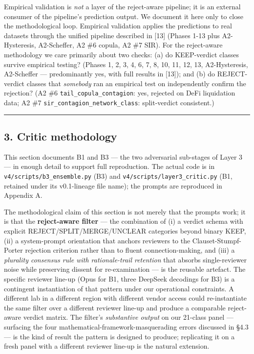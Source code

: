 \documentclass[
  letterpaper,
  11pt]{article}
\begin{document}
Empirical validation is \emph{not} a layer of the reject-aware pipeline;
it is an external consumer of the pipeline's prediction output. We
document it here only to close the methodological loop. Empirical
validation applies the predictions to real datasets through the unified
pipeline described in {[}13{]} (Phases 1-13 plus A2-Hysteresis,
A2-Scheffer, A2 \#6 copula, A2 \#7 SIR). For the reject-aware
methodology we care primarily about two checks: (a) do KEEP-verdict
classes survive empirical testing? (Phases 1, 2, 3, 4, 6, 7, 8, 10, 11,
12, 13, A2-Hysteresis, A2-Scheffer --- predominantly yes, with full
results in {[}13{]}); and (b) do REJECT-verdict classes that
\emph{somebody} ran an empirical test on independently confirm the
rejection? (A2 \#6 \texttt{tail\_copula\_contagion}: yes, rejected on
DeFi liquidation data; A2 \#7 \texttt{sir\_contagion\_network\_class}:
split-verdict consistent.)

\begin{center}\rule{0.5\linewidth}{0.5pt}\end{center}

\subsection{3. Critic methodology}\label{critic-methodology}

This section documents B1 and B3 --- the two adversarial sub-stages of
Layer 3 --- in enough detail to support full reproduction. The actual
code is in \texttt{v4/scripts/b3\_ensemble.py} (B3) and
\texttt{v4/scripts/layer3\_critic.py} (B1, retained under its
v0.1-lineage file name); the prompts are reproduced in Appendix A.

The methodological claim of this section is not merely that the prompts
work; it is that the \textbf{reject-aware filter} --- the combination of
(i) a verdict schema with explicit REJECT/SPLIT/MERGE/UNCLEAR categories
beyond binary KEEP, (ii) a system-prompt orientation that anchors
reviewers to the Clauset-Stumpf-Porter rejection criterion rather than
to fluent connection-making, and (iii) a \emph{plurality consensus rule
with rationale-trail retention} that absorbs single-reviewer noise while
preserving dissent for re-examination --- is the reusable artefact. The
specific reviewer line-up (Opus for B1, three DeepSeek decodings for B3)
is a contingent instantiation of that pattern under our operational
constraints. A different lab in a different region with different vendor
access could re-instantiate the same filter over a different reviewer
line-up and produce a comparable reject-aware verdict matrix. The
filter's \emph{substantive output} on our 21-class panel --- surfacing
the four mathematical-framework-masquerading errors discussed in §4.3
--- is the kind of result the pattern is designed to produce;
replicating it on a fresh panel with a different reviewer line-up is the
natural extension.
\end{document}
